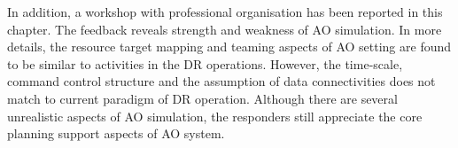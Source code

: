 


In addition, a workshop with professional organisation has been reported in this chapter. The feedback reveals strength and weakness of AO simulation. In more details, the resource target mapping and teaming aspects of AO setting are found to be similar to activities in the DR operations. However, the time-scale, command control structure and the assumption of data connectivities does not match to current paradigm of DR operation. Although there are several unrealistic aspects of AO simulation, the responders still appreciate the core planning support aspects of AO system.\\

